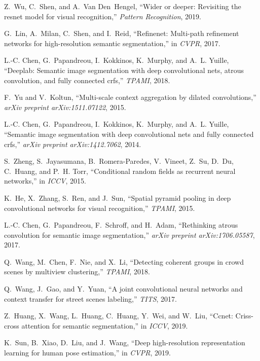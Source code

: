 \documentclass[journal]{IEEEtran}
\begin{document}
\begin{thebibliography}{10}
	Z.~Wu, C.~Shen, and A.~Van Den~Hengel, ``Wider or deeper: Revisiting the resnet
	model for visual recognition,'' \emph{Pattern Recognition}, 2019.
	
	G.~Lin, A.~Milan, C.~Shen, and I.~Reid, ``Refinenet: Multi-path refinement
	networks for high-resolution semantic segmentation,'' in \emph{CVPR}, 2017.
	
	L.-C. Chen, G.~Papandreou, I.~Kokkinos, K.~Murphy, and A.~L. Yuille, ``Deeplab:
	Semantic image segmentation with deep convolutional nets, atrous convolution,
	and fully connected crfs,'' \emph{TPAMI}, 2018.
	
	F.~Yu and V.~Koltun, ``Multi-scale context aggregation by dilated
	convolutions,'' \emph{arXiv preprint arXiv:1511.07122}, 2015.
	
	L.-C. Chen, G.~Papandreou, I.~Kokkinos, K.~Murphy, and A.~L. Yuille, ``Semantic
	image segmentation with deep convolutional nets and fully connected crfs,''
	\emph{arXiv preprint arXiv:1412.7062}, 2014.
	
	S.~Zheng, S.~Jayasumana, B.~Romera-Paredes, V.~Vineet, Z.~Su, D.~Du, C.~Huang,
	and P.~H. Torr, ``Conditional random fields as recurrent neural networks,''
	in \emph{ICCV}, 2015.
	
	K.~He, X.~Zhang, S.~Ren, and J.~Sun, ``Spatial pyramid pooling in deep
	convolutional networks for visual recognition,'' \emph{TPAMI}, 2015.
	
	L.-C. Chen, G.~Papandreou, F.~Schroff, and H.~Adam, ``Rethinking atrous
	convolution for semantic image segmentation,'' \emph{arXiv preprint
		arXiv:1706.05587}, 2017.
	
	Q.~Wang, M.~Chen, F.~Nie, and X.~Li, ``Detecting coherent groups in crowd
	scenes by multiview clustering,'' \emph{TPAMI}, 2018.
	
	Q.~Wang, J.~Gao, and Y.~Yuan, ``A joint convolutional neural networks and
	context transfer for street scenes labeling,'' \emph{TITS}, 2017.
	
	Z.~Huang, X.~Wang, L.~Huang, C.~Huang, Y.~Wei, and W.~Liu, ``Ccnet: Criss-cross
	attention for semantic segmentation,'' in \emph{ICCV}, 2019.
	
	K.~Sun, B.~Xiao, D.~Liu, and J.~Wang, ``Deep high-resolution representation
	learning for human pose estimation,'' in \emph{CVPR}, 2019.
	

\end{thebibliography}
\end{document}
